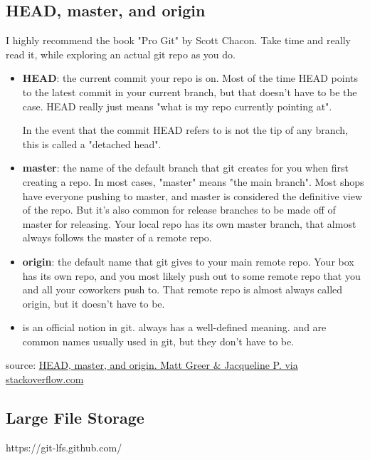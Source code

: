 \subsection{HEAD, master, and origin}

I highly recommend the book "Pro Git" by Scott Chacon. Take time and really read it, while exploring an actual git repo as you do.

\begin{itemize}
\item \textbf{HEAD}: the current commit your repo is on. Most of the time HEAD points to the latest commit in your current branch, but that doesn't have to be the case. HEAD really just means "what is my repo currently pointing at".

 In the event that the commit HEAD refers to is not the tip of any branch, this is called a "detached head".

\item
\textbf{master}: the name of the default branch that git creates for you when first creating a repo. In most cases, "master" means "the main branch". Most shops have everyone pushing to master, and master is considered the definitive view of the repo. But it's also common for release branches to be made off of master for releasing. Your local repo has its own master branch, that almost always follows the master of a remote repo.

\item
 \textbf{origin}: the default name that git gives to your main remote repo. Your box has its own repo, and you most likely push out to some remote repo that you and all your coworkers push to. That remote repo is almost always called origin, but it doesn't have to be.

\item
{} is an official notion in git.  always has a well-defined meaning.  and  are common names usually used in git, but they don't have to be.
\end{itemize}


source:  \href{https://stackoverflow.com/questions/8196544/what-are-the-git-concepts-of-head-master-origin}{HEAD, master, and origin. Matt Greer \& Jacqueline P. via stackoverflow.com}

\subsection{Large File Storage}

https://git-lfs.github.com/


